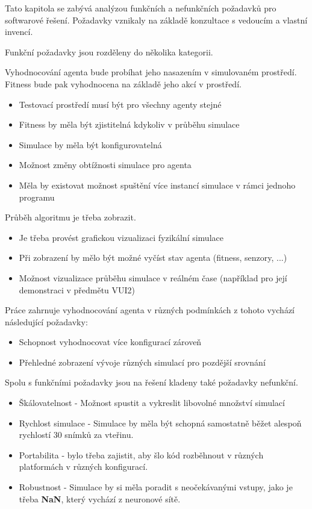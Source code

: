 Tato kapitola se zabývá analýzou funkčních a nefunkčních požadavků pro softwarové řešení. Požadavky vznikaly na základě konzultace s vedoucím a vlastní invencí.

Funkční požadavky jsou rozděleny do několika kategorii.

Vyhodnocování agenta bude probíhat jeho nasazením v simulovaném prostředí. Fitness bude pak vyhodnocena na základě jeho akcí v prostředí.
\begin{itemize}
	\item Testovací prostředí musí být pro všechny agenty stejné
	\item Fitness by měla být zjistitelná kdykoliv v průběhu simulace
	\item Simulace by měla být konfigurovatelná 
	\item Možnost změny obtížnosti simulace pro agenta
	\item Měla by existovat možnost spuštění více instancí simulace v rámci jednoho programu
\end{itemize}
Průběh algoritmu je třeba zobrazit.
\begin{itemize}
	\item Je třeba provést grafickou vizualizaci fyzikální simulace
	\item Při zobrazení by mělo být možné vyčíst stav agenta (fitness, senzory, ...) 
	\item Možnost vizualizace průběhu simulace v reálném čase (například pro její demonstraci v předmětu VUI2)
\end{itemize}

Práce zahrnuje vyhodnocování agenta v různých podmínkách z tohoto vychází následující požadavky:

\begin{itemize}
	\item Schopnost vyhodnocovat více konfigurací zároveň
	\item Přehledné zobrazení vývoje různých simulací pro pozdější srovnání
\end{itemize}

Spolu s funkčními požadavky jsou na řešení kladeny také požadavky nefunkční.
\begin{itemize}
	\item Škálovatelnost - Možnost spustit a vykreslit libovolné množství simulací
	\item Rychlost simulace - Simulace by měla být schopná samostatně běžet alespoň rychlostí 30 snímků za vteřinu.
	\item Portabilita - bylo třeba zajistit, aby šlo kód rozběhnout v různých platformách v různých konfigurací.
	\item Robustnost - Simulace by si měla poradit s neočekávanými vstupy, jako je třeba \textbf{NaN}, který vychází z neuronové sítě.
\end{itemize}
